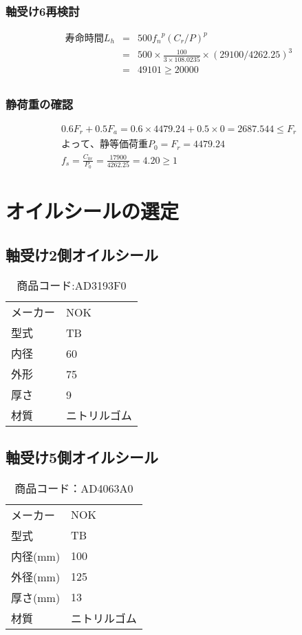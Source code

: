 \subsubsection{軸受け6再検討}
\begin{eqnarray}
寿命時間L_h &=& 500{f_n}^p(C_r/P)^p\\
           &=& 500 \times \frac{100}{3 \times 108.0235} \times (29100/4262.25)^3\\
           &=& 49101 \geq 20000\\
\end{eqnarray}

\subsubsection{静荷重の確認}
\begin{eqnarray}
0.6F_r+0.5F_a=0.6 \times 4479.24 + 0.5 \times 0 = 2687.544 \leq F_r\\
よって、静等価荷重P_0 = F_r = 4479.24\\
f_s = \frac{C_{0r}}{P_0} = \frac{17900}{4262.25} = 4.20\geq 1
\end{eqnarray}

\section{オイルシールの選定}
\subsection{軸受け2側オイルシール}
\begin{table}[htb]
\begin{center}
  \caption{商品コード:AD3193F0}
  \begin{tabular}{ll}
    \hline
    メーカー&NOK\\
    型式&TB\\
    内径&60\\
    外形&75\\
    厚さ&9\\
    材質&ニトリルゴム\\
    \hline
  \end{tabular}
\end{center}
\end{table}


\subsection{軸受け5側オイルシール}
\begin{table}[htb]
\begin{center}
  \caption{商品コード：AD4063A0}
  \begin{tabular}{ll}
    \hline
    メーカー&NOK\\
    型式&TB\\
    内径(mm)&100\\
    外径(mm)&125\\
    厚さ(mm)&13\\
    材質&ニトリルゴム\\
    \hline
  \end{tabular}
\end{center}
\end{table}

